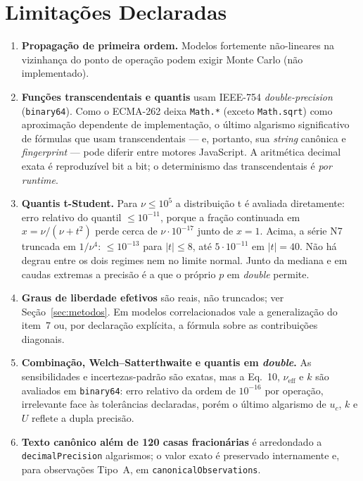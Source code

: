 \documentclass[11pt,a4paper]{article}
\begin{document}
\section{Limitações Declaradas}
\label{sec:limitacoes}

\begin{enumerate}
  \item \textbf{Propagação de primeira ordem.} Modelos fortemente não-lineares na vizinhança do ponto de operação podem exigir Monte Carlo (não implementado).
  \item \textbf{Funções transcendentais e quantis} usam IEEE-754 \emph{double-precision} (\texttt{binary64}). Como o ECMA-262 deixa \texttt{Math.*} (exceto \texttt{Math.sqrt}) como aproximação dependente de implementação, o último algarismo significativo de fórmulas que usam transcendentais --- e, portanto, sua \emph{string} canônica e \emph{fingerprint} --- pode diferir entre motores JavaScript. A aritmética decimal exata é reproduzível bit a bit; o determinismo das transcendentais é \emph{por runtime}.
  \item \textbf{Quantis t-Student.} Para \(\nu \leq 10^{5}\) a distribuição t é avaliada diretamente: erro relativo do quantil \(\leq 10^{-11}\), porque a fração continuada em \(x = \nu/(\nu + t^2)\) perde cerca de \(\nu \cdot 10^{-17}\) junto de \(x = 1\). Acima, a série N7 truncada em \(1/\nu^4\): \(\leq 10^{-13}\) para \(|t| \leq 8\), até \(5 \cdot 10^{-11}\) em \(|t| = 40\). Não há degrau entre os dois regimes nem no limite normal. Junto da mediana e em caudas extremas a precisão é a que o próprio \(p\) em \emph{double} permite.
  \item \textbf{Graus de liberdade efetivos} são reais, não truncados; ver Seção~\ref{sec:metodos}. Em modelos correlacionados vale a generalização do item~7 ou, por declaração explícita, a fórmula sobre as contribuições diagonais.
  \item \textbf{Combinação, Welch--Satterthwaite e quantis em \emph{double}.} As sensibilidades e incertezas-padrão são exatas, mas a Eq.~10, \(\nu_{\text{eff}}\) e \(k\) são avaliados em \texttt{binary64}: erro relativo da ordem de \(10^{-16}\) por operação, irrelevante face às tolerâncias declaradas, porém o último algarismo de \(u_c\), \(k\) e \(U\) reflete a dupla precisão.
  \item \textbf{Texto canônico além de 120 casas fracionárias} é arredondado a \texttt{decimalPrecision} algarismos; o valor exato é preservado internamente e, para observações Tipo~A, em \texttt{canonicalObservations}.

\end{enumerate}
\end{document}
